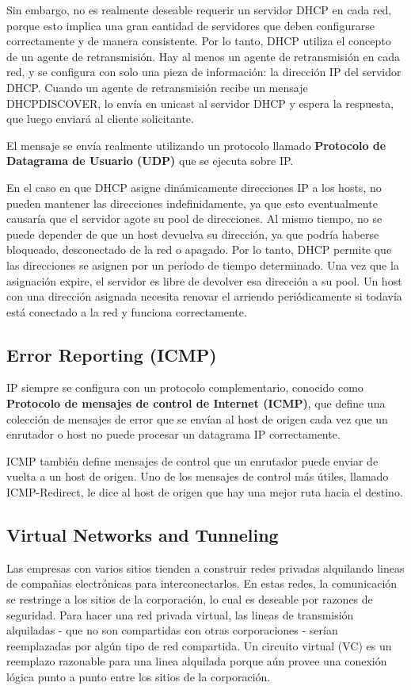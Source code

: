 Sin embargo, no es realmente deseable requerir un servidor DHCP en cada red, porque esto implica una gran cantidad de servidores que deben configurarse correctamente y de manera consistente. Por lo tanto, DHCP utiliza el concepto de un agente de retransmisión. Hay al menos un agente de retransmisión en cada red, y se configura con solo una pieza de información: la dirección IP del servidor DHCP. Cuando un agente de retransmisión recibe un mensaje DHCPDISCOVER, lo envía en unicast al servidor DHCP y espera la respuesta, que luego enviará al cliente solicitante.

El mensaje se envía realmente utilizando un protocolo llamado \textbf{Protocolo de Datagrama de Usuario (UDP)} que se ejecuta sobre IP.

En el caso en que DHCP asigne dinámicamente direcciones IP a los hosts, no pueden mantener las direcciones indefinidamente, ya que esto eventualmente causaría que el servidor agote su pool de direcciones. Al mismo tiempo, no se puede depender de que un host devuelva su dirección, ya que podría haberse bloqueado, desconectado de la red o apagado. Por lo tanto, DHCP permite que las direcciones se asignen por un período de tiempo determinado. Una vez que la asignación expire, el servidor es libre de devolver esa dirección a su pool. Un host con una dirección asignada necesita renovar el arriendo periódicamente si todavía está conectado a la red y funciona correctamente.

\subsection{Error Reporting (ICMP)}
IP siempre se configura con un protocolo complementario, conocido como \textbf{Protocolo de mensajes de control de Internet (ICMP)}, que define una colección de mensajes de error que se envían al host de origen cada vez que un enrutador o host no puede procesar un datagrama IP correctamente.

ICMP también define mensajes de control que un enrutador puede enviar de vuelta a un host de origen. Uno de los mensajes de control más útiles, llamado ICMP-Redirect, le dice al host de origen que hay una mejor ruta hacia el destino.

\subsection{Virtual Networks and Tunneling}

Las empresas con varios sitios tienden a construir redes privadas alquilando lineas de compañias electrónicas para interconectarlos. En estas redes, la comunicación se restringe a los sitios de la corporación, lo cual es deseable por razones de seguridad. Para hacer una red privada virtual, las lineas de transmisión alquiladas - que no son compartidas con otras corporaciones - serían reemplazadas por algún tipo de red compartida. Un circuito virtual (VC) es un reemplazo razonable para una linea alquilada porque aún provee una conexión lógica punto a punto entre los sitios de la corporación.

